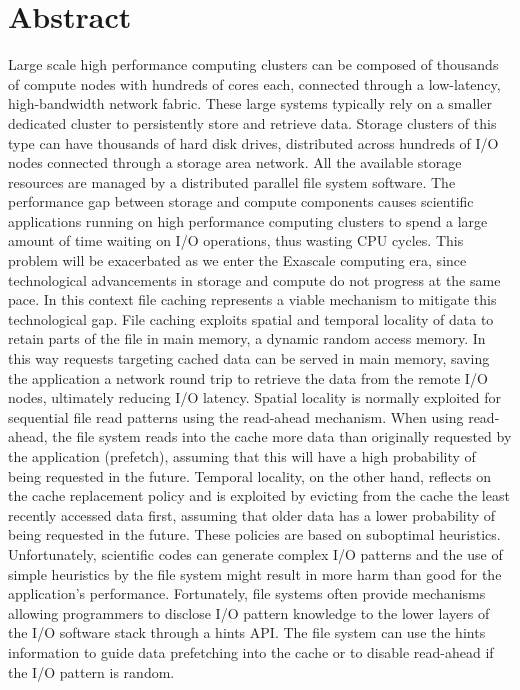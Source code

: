 \documentclass[a4paper,titlepage,oneside,11pt]{book}
\begin{document}
\chapter*{\centering \small Abstract}  
Large scale high performance computing clusters can be composed of thousands of compute nodes with hundreds of cores each, connected through a low-latency, high-bandwidth network fabric. These large systems typically 
rely on a smaller dedicated cluster to persistently store and retrieve data. Storage clusters of this type can have thousands of hard disk drives, distributed across hundreds of I/O nodes connected through a storage 
area network. All the available storage resources are managed by a distributed parallel file system software. The performance gap between storage and compute components causes scientific applications running on high performance 
computing clusters to spend a large amount of time waiting on I/O operations, thus wasting CPU cycles. This problem will be exacerbated as we enter the Exascale computing era, since technological advancements in storage
and compute do not progress at the same pace. In this context file caching represents a viable mechanism to mitigate this technological gap. File caching exploits spatial and temporal locality of data to retain parts 
of the file in main memory, a dynamic random access memory. In this way requests targeting cached data can be served in main memory, saving the application a network round trip to retrieve the data from the remote I/O nodes,
ultimately reducing I/O latency. Spatial locality is normally exploited for sequential file read patterns using the read-ahead mechanism. When using read-ahead, the file system reads into the cache more data than originally 
requested by the application (prefetch), assuming that this will have a high probability of being requested in the future. Temporal locality, on the other hand, reflects on the cache replacement policy and is exploited by evicting 
from the cache the least recently accessed data first, assuming that older data has a lower probability of being requested in the future. These policies are based on suboptimal heuristics. Unfortunately, scientific codes can generate 
complex I/O patterns and the use of simple heuristics by the file system might result in more harm than good for the application's performance. Fortunately, file systems often provide mechanisms allowing programmers to disclose 
I/O pattern knowledge to the lower layers of the I/O software stack through a hints API. The file system can use the hints information to guide data prefetching into the cache or to disable read-ahead if the I/O pattern is random. 
\end{document}
